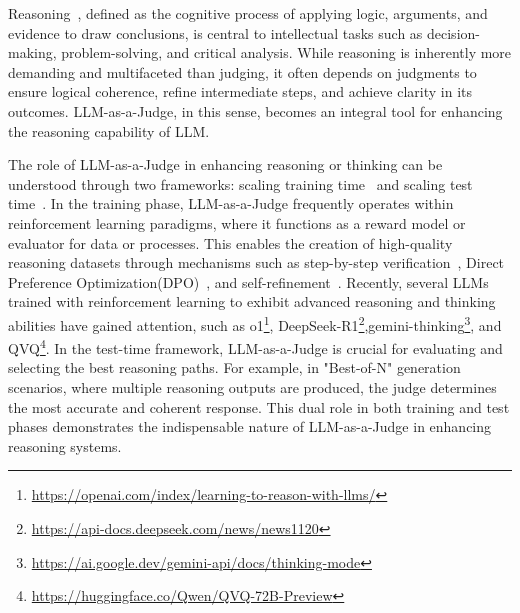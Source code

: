 Reasoning~\cite{reasoning_survey}, defined as the cognitive process of applying logic, arguments, and evidence to draw conclusions, is central to intellectual tasks such as decision-making, problem-solving, and critical analysis. 
While reasoning is inherently more demanding and multifaceted than judging, it often depends on judgments to ensure logical coherence, refine intermediate steps, and achieve clarity in its outcomes. LLM-as-a-Judge, in this sense, becomes an integral tool for enhancing the reasoning capability of LLM. 


The role of LLM-as-a-Judge in enhancing reasoning or thinking can be understood through two frameworks: scaling training time~\citep{scaling_rl,trung2024reft} and scaling test time~\cite{scaling_test_time}. In the training phase, LLM-as-a-Judge frequently operates within reinforcement learning paradigms, where it functions as a reward model or evaluator for data or processes. This enables the creation of high-quality reasoning datasets through mechanisms such as step-by-step verification~\cite{let_verify_step}, Direct Preference Optimization(DPO)~\cite{dpo}, and self-refinement~\cite{self_rewarding_lm}. Recently, several LLMs trained with reinforcement learning to exhibit advanced reasoning and thinking abilities have gained attention, such as o1\footnote{\url{https://openai.com/index/learning-to-reason-with-llms/}}, DeepSeek-R1\footnote{\url{https://api-docs.deepseek.com/news/news1120}},gemini-thinking\footnote{\url{https://ai.google.dev/gemini-api/docs/thinking-mode}}, and QVQ\footnote{\url{https://huggingface.co/Qwen/QVQ-72B-Preview}}. 
In the test-time framework, LLM-as-a-Judge is crucial for evaluating and selecting the best reasoning paths. For example, in "Best-of-N" generation scenarios, where multiple reasoning outputs are produced, the judge determines the most accurate and coherent response. This dual role in both training and test phases demonstrates the indispensable nature of LLM-as-a-Judge in enhancing reasoning systems.


\setcounter{footnote}{0}


